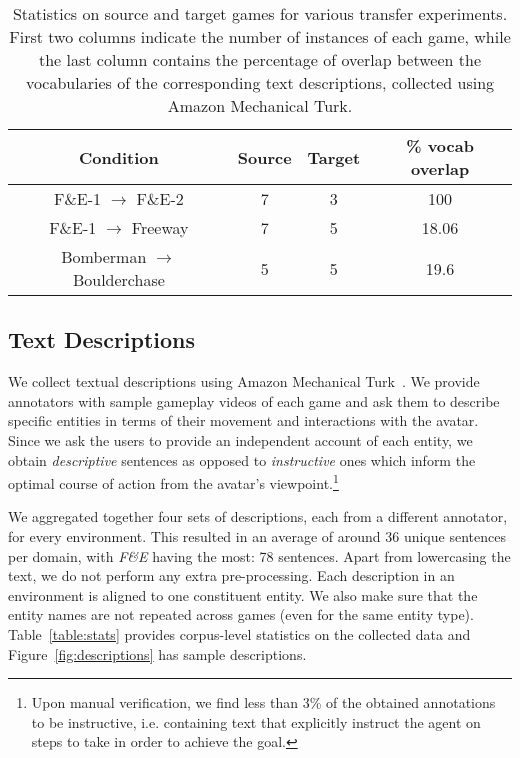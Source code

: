 \begin{table}[h]
\centering
\begin{tabular}{  c  c  c  c } %
\textbf{Condition} & \textbf{Source} & \textbf{Target} & \textbf{\% vocab overlap}\\ \midrule
F\&E-1 $\rightarrow$ F\&E-2 & 7 & 3 & 100 \\
F\&E-1 $\rightarrow$ Freeway & 7 & 5 & 18.06 \\ 
Bomberman $\rightarrow$ Boulderchase & 5 & 5 & 19.6 \\ 
\end{tabular}
\caption{Statistics on source and target games for various transfer experiments. First two columns indicate the number of instances of each game, while the last column contains the percentage of overlap between the vocabularies of the corresponding text descriptions, collected using Amazon Mechanical Turk.}
\label{table:variations}
\end{table}

\subsection{Text Descriptions}
We collect textual descriptions using Amazon Mechanical Turk~\cite{mturk}. We provide annotators with sample gameplay videos of each game and ask them to describe specific entities in terms of their movement and interactions with the avatar. Since we ask the users to provide an independent account of each entity, we obtain \emph{descriptive} sentences as opposed to \emph{instructive} ones which inform the optimal course of action from the avatar's viewpoint.\footnote{Upon manual verification, we find less than 3\% of the obtained annotations to be instructive, i.e. containing text that explicitly instruct the agent on steps to take in order to achieve the goal.} 

We aggregated together four sets of descriptions, each from a different annotator, for every environment. This resulted in an average of around 36 unique sentences per domain, with \emph{F\&E} having the most: 78 sentences. Apart from lowercasing the text, we do not perform any extra pre-processing. Each description in an environment is aligned to one constituent entity. We also make sure that the entity names are not repeated across games (even for the same entity type). Table~\ref{table:stats} provides corpus-level statistics on the collected data and Figure~\ref{fig:descriptions} has sample descriptions.

